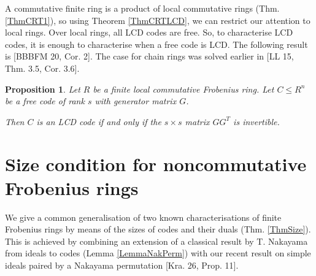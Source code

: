 \documentclass{article}
\theoremstyle{plain}
\newtheorem{Prop}[veta]{Proposition}
\theoremstyle{plain}
\theoremstyle{remark}
\theoremstyle{plain}
\newenvironment{dukaz}{
  \par\medskip \noindent
  \textit{Proof}.
}{

\rightline{$\qedsymbol$}
}
\begin{document}
 A commutative finite ring is a product of local commutative rings (Thm. \ref{ThmCRT1}), so using Theorem \ref{ThmCRTLCD}, we can restrict our attention to local rings. Over local rings, all LCD codes are free.  So, to characterise LCD codes, it is enough to characterise when a free code is LCD.  The following result is [BBBFM 20, Cor. 2]. The case for chain rings was solved earlier in [LL 15, Thm. 3.5, Cor. 3.6].  
\begin{Prop}\label{ThmLCDlocal}
    Let $R$ be a finite local commutative Frobenius ring. Let $C\leq R^n$ be a free code of rank $s$ with generator matrix $G$.

    Then $C$ is an LCD code if and only if the $s\times s$ matrix $GG^T$ is invertible.
\end{Prop}


\section{Size condition for noncommutative Frobenius rings}\label{SecSize}

We give a common generalisation of two known characterisations of finite Frobenius rings by means of the sizes of codes and their duals (Thm. \ref{ThmSize}). This is achieved by combining an extension of a classical result by T. Nakayama  from ideals to codes (Lemma \ref{LemmaNakPerm}) with our recent result on simple ideals paired by a Nakayama permutation [Kra. 26, Prop. 11].
\end{document}

